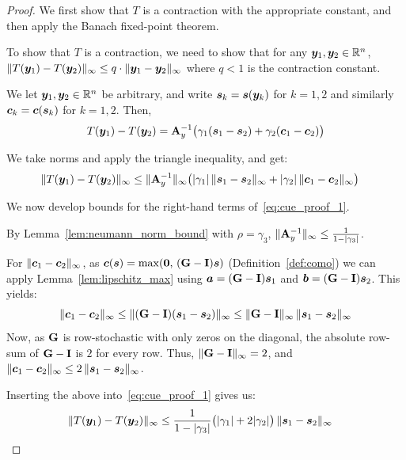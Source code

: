 \begin{proof}
We first show that $T$ is a contraction with the appropriate constant, and then apply the Banach fixed-point theorem.

To show that $T$ is a contraction, we need to show that for any $\bm{y}_1, \bm{y}_2 \in \mathbb{R}^n$, $\|T(\bm{y}_1) - T(\bm{y}_2)\|_\infty \leq q \cdot \|\bm{y}_1 - \bm{y}_2\|_\infty$ where $q < 1$ is the contraction constant.

We let $\bm{y}_1, \bm{y}_2 \in \mathbb{R}^n$ be arbitrary, and write $\bm{s}_k = \bm{s}(\bm{y}_k)$ for $k = 1, 2$ and similarly $\bm{c}_k = \bm{c}(\bm{s}_k)$ for $k = 1, 2$. Then,
\begin{equation}
    T(\bm{y}_1) - T(\bm{y}_2) = \mathbf{A}_y^{-1}\bigl(\gamma_1(\bm{s}_1 - \bm{s}_2) + \gamma_2(\bm{c}_1 - \bm{c}_2)\bigr)
\end{equation}

We take norms and apply the triangle inequality, and get:
\begin{align}
    \|T(\bm{y}_1) - T(\bm{y}_2)\|_\infty
    &\leq \|\mathbf{A}_y^{-1}\|_\infty \bigl(|\gamma_1|\,\|\bm{s}_1 - \bm{s}_2\|_\infty + |\gamma_2|\,\|\bm{c}_1 - \bm{c}_2\|_\infty\bigr)
    \label{eq:cue_proof_1}
\end{align}

We now develop bounds for the right-hand terms of~\eqref{eq:cue_proof_1}.

By Lemma~\ref{lem:neumann_norm_bound} with $\rho = \gamma_3$, $\|\mathbf{A}_y^{-1}\|_\infty \leq \frac{1}{1 - |\gamma_3|}$.

For $\|\bm{c}_1 - \bm{c}_2\|_\infty$, as $\bm{c}(\bm{s}) = \max(\bm{0},\, (\mathbf{G} - \mathbf{I})\bm{s})$ (Definition~\ref{def:como}) we can apply Lemma~\ref{lem:lipschitz_max} using $\bm{a} = (\mathbf{G} - \mathbf{I})\bm{s}_1$ and $\bm{b} = (\mathbf{G} - \mathbf{I})\bm{s}_2$. This yields:
\begin{equation}
\label{eq:pf_step2_lip}
    \|\bm{c}_1 - \bm{c}_2\|_\infty \leq \|(\mathbf{G} - \mathbf{I})(\bm{s}_1 - \bm{s}_2)\|_\infty \leq \|\mathbf{G} - \mathbf{I}\|_\infty \,\|\bm{s}_1 - \bm{s}_2\|_\infty
\end{equation}
Now, as $\mathbf{G}$ is row-stochastic with only zeros on the diagonal, the absolute row-sum of $\mathbf{G} - \mathbf{I}$ is $2$ for every row. Thus, $\|\mathbf{G} - \mathbf{I}\|_\infty = 2$, and $\|\bm{c}_1 - \bm{c}_2\|_\infty \leq 2\,\|\bm{s}_1 - \bm{s}_2\|_\infty$.

Inserting the above into~\eqref{eq:cue_proof_1} gives us:
\begin{align}
    \|T(\bm{y}_1) - T(\bm{y}_2)\|_\infty
    &\leq \frac{1}{1 - |\gamma_3|}\bigl(|\gamma_1| + 2|\gamma_2|\bigr)\,\|\bm{s}_1 - \bm{s}_2\|_\infty \label{eq:cue_proof_2}
\end{align}


\end{proof}
